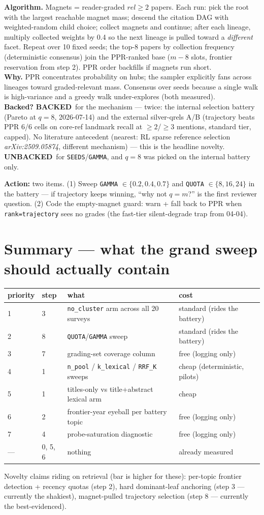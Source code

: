 \documentclass[10pt]{article}
\newcommand{\backedyes}{\textcolor{green!50!black}{\textbf{BACKED}}}
\newcommand{\backedno}{\textcolor{red!70!black}{\textbf{UNBACKED}}}
\newcommand{\lit}[1]{\textcolor{blue!60!black}{\textit{#1}}}
\newcommand{\act}[1]{\par\smallskip\noindent\textbf{Action:} #1}
\begin{document}
\textbf{Algorithm.} Magnets = reader-graded $rel \geq 2$ papers. Each run: pick the root
with the largest reachable magnet mass; descend the citation DAG with weighted-random child
choice; collect magnets and continue; after each lineage, multiply collected weights by 0.4
so the next lineage is pulled toward a \emph{different} facet. Repeat over 10 fixed seeds;
the top-8 papers by collection frequency (deterministic consensus) join the PPR-ranked base
($m-8$ slots, frontier reservation from step 2). PPR order backfills if magnets run short. \\
\textbf{Why.} PPR concentrates probability on hubs; the sampler explicitly fans across
lineages toward graded-relevant mass. Consensus over seeds because a single walk is
high-variance and a greedy walk under-explores (both measured). \\
\textbf{Backed?} \backedyes\ for the mechanism --- twice: the internal selection battery
(Pareto at $q{=}8$, 2026-07-14) and the external silver-qrels A/B (trajectory beats PPR 6/6
cells on core-ref landmark recall at ${\geq}2$/${\geq}3$ mentions, standard tier, capped).
No literature antecedent (nearest: RL sparse reference selection \lit{arXiv:2509.05874},
different mechanism) --- this is the headline novelty. \backedno\ for
\texttt{SEEDS}/\texttt{GAMMA}, and $q{=}8$ was picked on the internal battery only. \\
\act{two items. (1) Sweep \texttt{GAMMA} $\in \{0.2, 0.4, 0.7\}$ and \texttt{QUOTA}
$\in \{8, 16, 24\}$ in the battery --- if trajectory keeps winning, ``why not $q{=}m$?'' is
the first reviewer question. (2) Code the empty-magnet guard: warn + fall back to PPR when
\texttt{rank=trajectory} sees no grades (the fast-tier silent-degrade trap from 04-04).}

\section*{Summary --- what the grand sweep should actually contain}

\begin{center}
\begin{tabular}{@{}llll@{}}
\toprule
priority & step & what & cost \\
\midrule
1 & 3 & \texttt{no\_cluster} arm across all 20 surveys & standard (rides the battery) \\
2 & 8 & \texttt{QUOTA}/\texttt{GAMMA} sweep & standard (rides the battery) \\
3 & 7 & grading-set coverage column & free (logging only) \\
4 & 1 & \texttt{n\_pool} / \texttt{k\_lexical} / \texttt{RRF\_K} sweeps & cheap (deterministic, pilots) \\
5 & 1 & titles-only vs title+abstract lexical arm & cheap \\
6 & 2 & frontier-year eyeball per battery topic & free (logging only) \\
7 & 4 & probe-saturation diagnostic & free (logging only) \\
--- & 0, 5, 6 & nothing & already measured \\
\bottomrule
\end{tabular}
\end{center}

\medskip
\noindent Novelty claims riding on retrieval (bar is higher for these): per-topic frontier
detection + recency quotas (step 2), hard dominant-leaf anchoring (step 3 --- currently the
shakiest), magnet-pulled trajectory selection (step 8 --- currently the best-evidenced).
\end{document}
